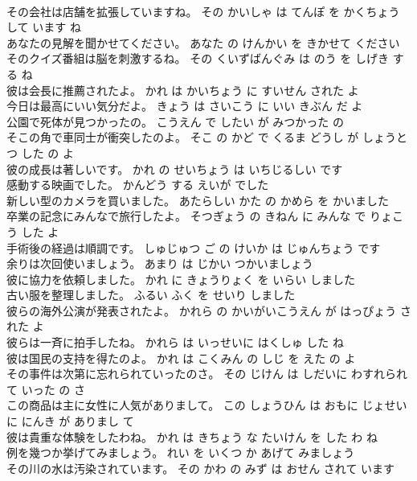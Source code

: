 \documentclass[8pt]{extreport}
\begin{document}
\begin{CJK}{UTF8}{min}
\\	その会社は店舗を拡張していますね。	その かいしゃ は てんぽ を かくちょう して います ね 
\\	あなたの見解を聞かせてください。	あなた の けんかい を きかせて ください 
\\	そのクイズ番組は脳を刺激するね。	その くいずばんぐみ は のう を しげき する ね 
\\	彼は会長に推薦されたよ。	かれ は かいちょう に すいせん された よ 
\\	今日は最高にいい気分だよ。	きょう は さいこう に いい きぶん だ よ 
\\	公園で死体が見つかったの。	こうえん で したい が みつかった の 
\\	そこの角で車同士が衝突したのよ。	そこ の かど で くるま どうし が しょうとつ した の よ 
\\	彼の成長は著しいです。	かれ の せいちょう は いちじるしい です 
\\	感動する映画でした。	かんどう する えいが でした 
\\	新しい型のカメラを買いました。	あたらしい かた の かめら を かいました 
\\	卒業の記念にみんなで旅行したよ。	そつぎょう の きねん に みんな で りょこう した よ 
\\	手術後の経過は順調です。	しゅじゅつ ご の けいか は じゅんちょう です 
\\	余りは次回使いましょう。	あまり は じかい つかいましょう 
\\	彼に協力を依頼しました。	かれ に きょうりょく を いらい しました 
\\	古い服を整理しました。	ふるい ふく を せいり しました 
\\	彼らの海外公演が発表されたよ。	かれら の かいがいこうえん が はっぴょう された よ 
\\	彼らは一斉に拍手したね。	かれら は いっせいに はくしゅ した ね 
\\	彼は国民の支持を得たのよ。	かれ は こくみん の しじ を えた の よ 
\\	その事件は次第に忘れられていったのさ。	その じけん は しだいに わすれられて いった の さ 
\\	この商品は主に女性に人気がありまして。	この しょうひん は おもに じょせい に にんき が ありまし て 
\\	彼は貴重な体験をしたわね。	かれ は きちょう な たいけん を した わ ね 
\\	例を幾つか挙げてみましょう。	れい を いくつ か あげて みましょう 
\\	その川の水は汚染されています。	その かわ の みず は おせん されて います 

\end{CJK}
\end{document}
